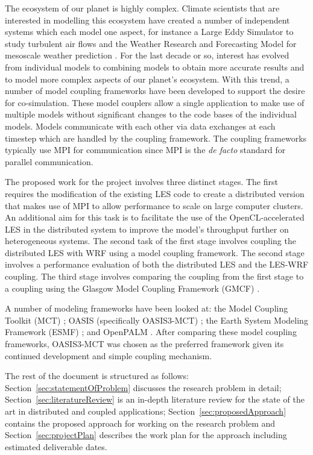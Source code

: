 The ecosystem of our planet is highly complex. Climate scientists that are
interested in modelling this ecosystem have created a number of independent
systems which each model one aspect, for instance a Large Eddy Simulator to
study turbulent air flows \cite{Nakayama2011,Nakayama2012} and the Weather
Research and Forecasting Model for mesoscale weather prediction
\cite{Michalakes2000}. For the last decade or so, interest has evolved from
individual models to combining models \cite{Michalakes2010} to obtain more
accurate results and to model more complex aspects of our planet's ecosystem.
With this trend, a number of model coupling frameworks have been developed to
support the desire for co-simulation. These model couplers allow a single
application to make use of multiple models without significant changes to the
code bases of the individual models. Models communicate with each other via data
exchanges at each timestep which are handled by the coupling framework. The
coupling frameworks typically use MPI for communication since MPI is the
\textit{de facto} standard for parallel communication.

The proposed work for the project involves three distinct stages. The first
requires the modification of the existing LES code to create a distributed
version that makes use of MPI to allow performance to scale on large computer
clusters. An additional aim for this task is to facilitate the use of the
OpenCL-accelerated LES \cite{Vanderbauwhede2014} in the distributed system to
improve the model's throughput further on heterogeneous systems. The second task
of the first stage involves coupling the distributed LES with WRF using a model
coupling framework. The second stage involves a performance evaluation of both
the distributed LES and the LES-WRF coupling. The third stage involves comparing
the coupling from the first stage to a coupling using the Glasgow Model Coupling
Framework (GMCF) \cite{Vanderbauwhede2014}.

A number of modeling frameworks have been looked at: the Model Coupling Toolkit
(MCT) \cite{Larson2005,Jacob2005}; OASIS (specifically OASIS3-MCT)
\cite{Valcke,Valcke2013}; the Earth System Modeling Framework (ESMF)
\cite{Ramework2004}; and OpenPALM \cite{Piacentini2011}. After comparing these
model coupling frameworks, OASIS3-MCT was chosen as the preferred framework
given its continued development and simple coupling mechanism.

The rest of the document is structured as follows:
Section~\ref{sec:statementOfProblem} discusses the research problem in detail;
Section~\ref{sec:literatureReview} is an in-depth literature review for the
state of the art in distributed and coupled applications;
Section~\ref{sec:proposedApproach} contains the proposed approach for working on
the research problem and Section~\ref{sec:projectPlan} describes the work plan
for the approach including estimated deliverable dates.
